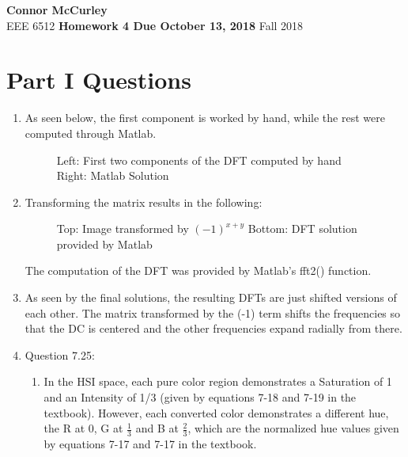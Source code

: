 \documentclass{article}[12 pt]
\begin{document}
	
\begin{center}
	\textbf{\Large Connor McCurley} \\
	EEE 6512 \qquad \textbf{\large Homework 4 Due October 13, 2018} \qquad Fall 2018 
\end{center}

\section*{Part I Questions}

\begin{enumerate}
\item As seen below, the first component is worked by hand, while the rest were computed through Matlab.

\begin{figure}[H]
\captionsetup[subfloat]{labelformat=empty}
\centering
{}
\newline
{}
\caption{Left: First two components of the DFT computed by hand Right: Matlab Solution}
\end{figure}

\item Transforming the matrix results in the following:

\begin{figure}[H]
\captionsetup[subfloat]{labelformat=empty}
\centering
{}
\newline
{}
\caption{Top: Image transformed by $(-1)^{x+y}$ Bottom: DFT solution provided by Matlab}
\end{figure}

The computation of the DFT was provided by Matlab's fft2() function.

\item As seen by the final solutions, the resulting DFTs are just shifted versions of each other.  The matrix transformed by the (-1) term shifts the frequencies so that the DC is centered and the other frequencies expand radially from there.

\item Question 7.25:
	\begin{enumerate}[label=\alph*]
		\item In the HSI space, each pure color region demonstrates a Saturation of 1 and an Intensity of 1/3 (given by equations 7-18 and 7-19 in the textbook).  However, each converted color demonstrates a different hue, the R at 0, G at $\frac{1}{3}$ and B at $\frac{2}{3}$, which are the normalized hue values given by equations 7-17 and 7-17 in the textbook.


\end{enumerate}
\end{enumerate}
\end{document}
